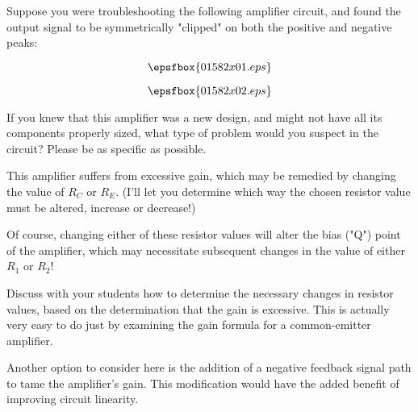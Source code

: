 

Suppose you were troubleshooting the following amplifier circuit, and found the output signal to be symmetrically "clipped" on both the positive and negative peaks:

$$\epsfbox{01582x01.eps}$$

$$\epsfbox{01582x02.eps}$$

If you knew that this amplifier was a new design, and might not have all its components properly sized, what type of problem would you suspect in the circuit?  Please be as specific as possible.







This amplifier suffers from excessive gain, which may be remedied by changing the value of $R_C$ or $R_E$.  (I'll let you determine which way the chosen resistor value must be altered, increase or decrease!)

Of course, changing either of these resistor values will alter the bias ("Q") point of the amplifier, which may necessitate subsequent changes in the value of either $R_1$ or $R_2$!







Discuss with your students how to determine the necessary changes in resistor values, based on the determination that the gain is excessive.  This is actually very easy to do just by examining the gain formula for a common-emitter amplifier.

Another option to consider here is the addition of a negative feedback signal path to tame the amplifier's gain.  This modification would have the added benefit of improving circuit linearity.




